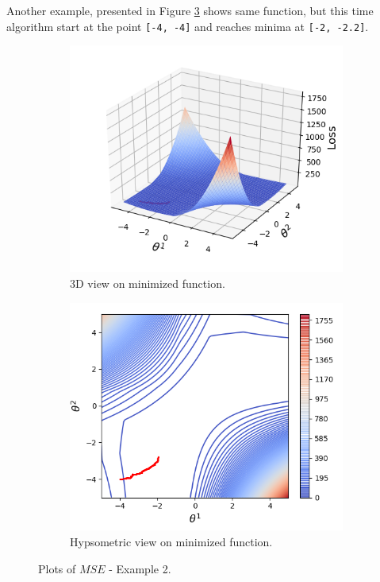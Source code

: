 \documentclass[11pt,a4paper]{IEEEtran}
\begin{document}
Another example, presented in Figure \ref{fig:ex2} shows same function, but this time algorithm start at the point \texttt{[-4, -4]} and reaches minima at \texttt{[-2, -2.2]}.

\begin{figure}[!hbt]
\centering
	\begin{subfigure}[b]{0.47\textwidth}
		\includegraphics[width=\textwidth]{examples/2/3d.png}
		\caption{3D view on minimized function.}
		\label{fig:ex2:3d-view}
	\end{subfigure}
	\begin{subfigure}[b]{0.47\textwidth}
		\includegraphics[width=\textwidth]{examples/2/2d.png}
		\caption{Hypsometric view on minimized function.}
		\label{fig:ex2:hypsometric}
	\end{subfigure}
	\caption{Plots of $MSE$ - Example 2.}
	\label{fig:ex2}
\end{figure}
\end{document}
